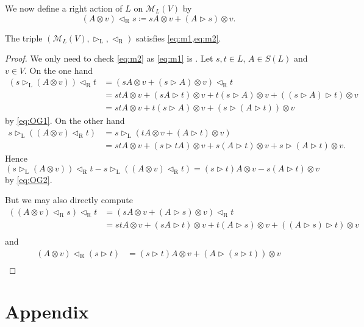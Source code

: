 \documentclass[noamsfonts, reqno]{amsart}
\newcommand{\prelie}{\mathbin{\vartriangleright}}
\newcommand{\laction}{\mathbin{\vartriangleright_{\mathrm{L}}}}
\newcommand{\raction}{\mathbin{\vartriangleleft_{\mathrm{R}}}}
\begin{document}
We now define a right action of \(L\) on \(\mathcal{M}_L(V)\) by
\[
  (A\otimes v)\raction s \coloneqq sA\otimes v + (A\prelie s)\otimes v.
\]
\begin{proposition}
  The triple \((\mathcal{M}_L(V),\laction,\raction)\) satisfies \cref{eq:m1,eq:m2}.
\end{proposition}
\begin{proof}
  We only need to check \cref{eq:m2} as \cref{eq:m1} is .
  Let \(s,t\in L\), \(A\in S(L)\) and \(v\in V\).
  On the one hand
  \begin{align*}
    (s\laction(A\otimes v))\raction t &= (sA\otimes v +(s\prelie A)\otimes v)\raction t \\
    &= stA\otimes v + (sA\prelie t)\otimes v + t(s\prelie A)\otimes v + ((s\prelie A)\prelie t)\otimes v \\
    &= stA\otimes v + t(s\prelie A)\otimes v + (s\prelie(A\prelie t))\otimes v
  \end{align*}
  by \cref{eq:OG1}.
  On the other hand
  \begin{align*}
    s\laction((A\otimes v)\raction t) &= s\laction(tA\otimes v + (A\prelie t)\otimes v) \\
    &= stA\otimes v + (s\prelie tA)\otimes v + s(A\prelie t)\otimes v + s\prelie(A\prelie t) \otimes v.
  \end{align*}
  Hence
  \[
    (s\laction(A\otimes v))\raction t - s\laction((A\otimes v)\raction t) = (s\prelie t)A\otimes v - s(A\prelie t)\otimes v
  \]
  by \cref{eq:OG2}.

  But we may also directly compute
  \begin{align*}
    ((A\otimes v)\raction s)\raction t &= (sA\otimes v + (A\prelie s)\otimes v)\raction t \\
    &= stA\otimes v + (sA\prelie t)\otimes v + t(A\prelie s)\otimes v + ((A\prelie s)\prelie t)\otimes v \\
  \end{align*}
  and
  \begin{align*}
    (A\otimes v)\raction(s\prelie t) &= (s\prelie t)A\otimes v + (A\prelie(s\prelie t))\otimes v \\
  \end{align*}
\end{proof}




\appendix

\section{Appendix}
\end{document}

